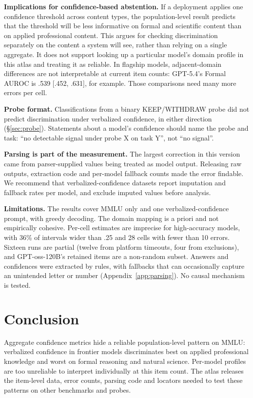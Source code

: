 \textbf{Implications for confidence-based abstention.} If a deployment applies one confidence threshold across content types, the population-level result predicts that the threshold will be less informative on formal and scientific content than on applied professional content. This argues for checking discrimination separately on the content a system will see, rather than relying on a single aggregate. It does not support looking up a particular model's domain profile in this atlas and treating it as reliable. In flagship models, adjacent-domain differences are not interpretable at current item counts: GPT-5.4's Formal AUROC is .539 [.452, .631], for example. Those comparisons need many more errors per cell.

\textbf{Probe format.} Classifications from a binary KEEP/WITHDRAW probe did not predict discrimination under verbalized confidence, in either direction (\S\ref{sec:probe}). Statements about a model's confidence should name the probe and task: ``no detectable signal under probe X on task Y'', not ``no signal''.

\textbf{Parsing is part of the measurement.} The largest correction in this version came from parser-supplied values being treated as model output. Releasing raw outputs, extraction code and per-model fallback counts made the error findable. We recommend that verbalized-confidence datasets report imputation and fallback rates per model, and exclude imputed values before analysis.

\textbf{Limitations.} The results cover MMLU only and one verbalized-confidence prompt, with greedy decoding. The domain mapping is a priori and not empirically cohesive. Per-cell estimates are imprecise for high-accuracy models, with 36\% of intervals wider than .25 and 28 cells with fewer than 10 errors. Sixteen runs are partial (twelve from platform timeouts, four from exclusions), and GPT-oss-120B's retained items are a non-random subset. Answers and confidences were extracted by rules, with fallbacks that can occasionally capture an unintended letter or number (Appendix~\ref{app:parsing}). No causal mechanism is tested.

\section{Conclusion}

Aggregate confidence metrics hide a reliable population-level pattern on MMLU: verbalized confidence in frontier models discriminates best on applied professional knowledge and worst on formal reasoning and natural science. Per-model profiles are too unreliable to interpret individually at this item count. The atlas releases the item-level data, error counts, parsing code and locators needed to test these patterns on other benchmarks and probes.

